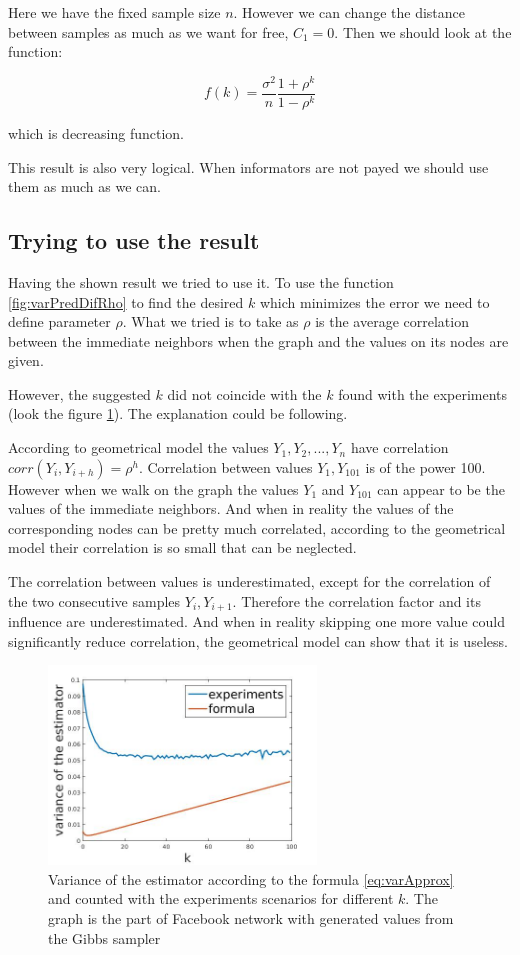 \documentclass[12pt]{report}
\begin{document}
Here we have the fixed sample size $n$. However we can change the distance between samples as much as we want for free, $C_1 = 0$. Then we should look at the function:

$$ f(k) = \frac{\sigma^2}{n} \frac{1+\rho^{k}}{1-\rho^{k}}$$

which is decreasing function.

This result is also very logical. When informators are not payed we should use them as much as we can.

\subsection{Trying to use the result}

Having the shown result we tried to use it. To use the function \ref{fig:varPredDifRho} to find the desired $k$ which minimizes the error we need to define parameter $\rho$. What we tried is to take as $\rho$ is the average correlation between the immediate neighbors when the graph and the values on its nodes are given.

However, the suggested $k$ did not coincide with the $k$ found with the experiments (look the figure \ref{fig:facebookBad}). The explanation could be following. 

According to geometrical model the values $Y_1, Y_2, ..., Y_n$ have correlation $corr(Y_i, Y_{i+h}) = \rho^h$. Correlation between values $Y_1, Y_{101}$ is of the power 100. However when we walk on the graph the values $Y_1$ and $Y_{101}$ can appear to be the values of the immediate neighbors. And when in reality the values of the corresponding nodes can be pretty much correlated, according to the geometrical model their correlation is so small that can be neglected.

The correlation between values is underestimated, except for the correlation of the two consecutive samples $Y_i, Y_{i+1}$. Therefore the correlation factor and its influence are underestimated. And when in reality skipping one more value could significantly reduce correlation,  the geometrical model can show that it is useless.

\begin{figure}[ht]
    \centering
    \includegraphics[height=200px]{facebookBad}
    \caption{Variance of the estimator according to the formula \ref{eq:varApprox} and counted with the experiments scenarios for different $k$. The graph is the part of Facebook network \cite{Facebook} with generated values from the Gibbs sampler}
    \label{fig:facebookBad}
\end{figure}
\end{document}
